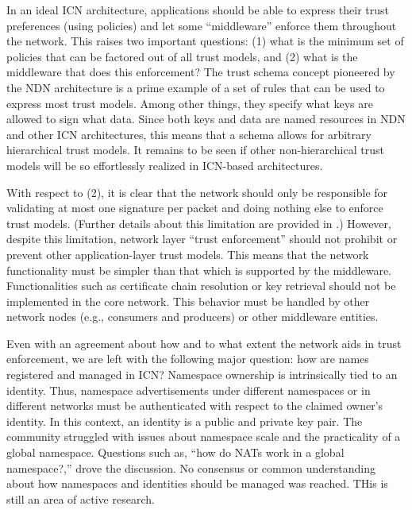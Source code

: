 In an ideal ICN architecture, applications should be able to express their trust preferences
(using policies) and let some ``middleware'' enforce them throughout the network. This raises
two important questions: (1) what is the minimum set of policies that can be factored out of
all trust models, and (2) what is the middleware that does this enforcement? The trust schema concept
pioneered by the NDN architecture \cite{schemas} is a prime example of a set of rules that can be
used to express most trust models. Among other things, they specify what keys are allowed to
sign what data. Since both keys and data are named resources in NDN and other ICN architectures,
this means that a schema allows for arbitrary hierarchical trust models. It remains to be seen
if other non-hierarchical trust models will be so effortlessly realized in ICN-based architectures.

With respect to (2), it is clear that the network should only be responsible for
validating at most one signature per packet and doing nothing else to enforce
trust models. (Further details about this limitation are provided in \cite{trust}.)
However, despite this limitation, network layer ``trust enforcement'' should not prohibit or prevent other
application-layer trust models. This means that the network functionality must be simpler than
that which is supported by the middleware. Functionalities such as certificate chain
resolution or key retrieval should not be implemented in the core network.
This behavior must be handled by other network nodes (e.g., consumers and producers)
or other middleware entities.

Even with an agreement about how and to what extent the network aids in trust
enforcement, we are left with the following major question: how are names registered and managed in ICN?
Namespace ownership is intrinsically tied to an identity. Thus, namespace advertisements under
different namespaces or in different networks must be authenticated with respect to the
claimed owner's identity. In this context, an identity is a public and private key pair.
The community struggled with issues about namespace scale and the practicality of a global
namespace. Questions such as, ``how do NATs work in a global namespace?,'' drove the
discussion. No consensus or common understanding about how namespaces and identities
should be managed was reached. THis is still an area of active research.

